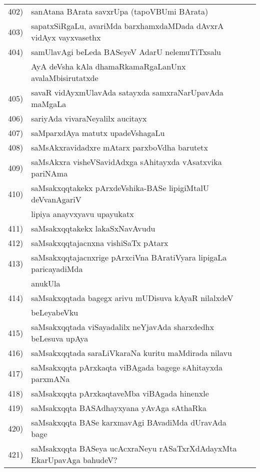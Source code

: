 {\begin{longtable}{@{}cp{7.4cm}r}
402) & sanAtana BArata savxrUpa (tapoVBUmi BArata) & \pageref{page103}\\
403) & sapatxSiRgaLu, avariMda barxhamxdaMDada dAvxrA vidAyx vayxvasethx & \pageref{page92}\\
404) & samUlavAgi beLeda BASeyeV AdarU nelemuTiTxsalu & \\
     & AyA deVsha kAla dhamaRkamaRgaLanUnx avalaMbisirutatxde & \pageref{page196}\\
405) & savaR vidAyxmUlavAda satayxda samxraNarUpavAda maMgaLa & \pageref{20e}\\
406) & sariyAda vivaraNeyalilx aucitayx & \pageref{page117}\\
407) & saMparxdAya matutx upadeVshagaLu & \pageref{page105}\\
408) & saMsAkxravidadxre mAtarx parxboVdha barutetx & \pageref{page124}\\
409) & saMsAkxra visheVSavidAdxga sAhitayxda vAsatxvika pariNAma & \pageref{page213}\\
410) & saMsakxqqtakekx pArxdeVshika-BASe lipigiMtalU deVvanAgariV & \\
     & lipiya anayvxyavu upayukatx & \pageref{page33}\\
411) & saMsakxqqtakekx lakaSxNavAvudu & \pageref{page2}\\
412) & saMsakxqqtajacnxna vishiSaTx pAtarx & \pageref{page30}\\
413) & saMsakxqqtajacnxrige pArxciVna BAratiVyara lipigaLa paricayadiMda & \\
     & anukUla & \pageref{page52}\\
414) & saMsakxqqtada bagegx arivu mUDisuva kAyaR nilalxdeV& \\
     & beLeyabeVku &\pageref{page21}\\
415) & saMsakxqqtada viSayadalilx neYjavAda sharxdedhx beLesuva upAya & \pageref{page31}\\
416) & saMsakxqqtada saraLiVkaraNa kuritu maMdirada nilavu & \pageref{page35}\\
417) & saMsakxqqta pArxkaqta viBAgada bagege sAhitayxda parxmANa & \pageref{page12}\\
418) & saMsakxqqta pArxkaqtaveMba viBAgada hinenxle & \pageref{page11}\\
419) & saMsakxqqta BASAdhayxyana yAvAga sAthaRka & \pageref{page27}\\
420) & saMsakxqqta BASe karxmavAgi BAvadiMda dUravAda bage & \pageref{page15}\\
421) & saMsakxqqta BASeya ucAcxraNeyu rASaTxrXdAdayxMta EkarUpavAga bahudeV? & \pageref{page33}\\

\end{longtable}}
